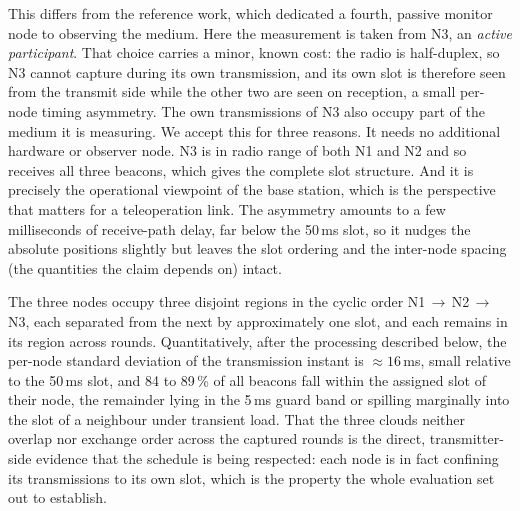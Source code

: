 This differs from the reference work, which dedicated a fourth, passive monitor
node to observing the medium. Here the measurement is taken from N3, an
\emph{active participant}. That choice carries a minor, known cost: the radio is
half-duplex, so N3 cannot capture during its own transmission, and its own slot
is therefore seen from the transmit side while the other two are seen on
reception, a small per-node timing asymmetry. The own transmissions of N3 also occupy
part of the medium it is measuring. We accept this for three reasons. It needs no
additional hardware or observer node. N3 is in radio range of both N1 and N2 and
so receives all three beacons, which gives the complete slot structure. And it is
precisely the operational viewpoint of the base station, which is the perspective that
matters for a teleoperation link. The asymmetry amounts to a few milliseconds of
receive-path delay, far below the 50\,ms slot, so it nudges the absolute positions
slightly but leaves the slot ordering and the inter-node spacing (the
quantities the claim depends on) intact.

The three nodes occupy three disjoint regions in the cyclic order
N1\,$\to$\,N2\,$\to$\,N3, each separated from the next by approximately one
slot, and each remains in its region across rounds. Quantitatively, after the
processing described below, the per-node standard deviation of the transmission
instant is $\approx 16$\,ms, small relative to the 50\,ms slot, and
84 to 89\,\% of all beacons fall within the assigned slot of their node, the remainder
lying in the 5\,ms guard band or spilling marginally into the slot of a neighbour
under transient load. That the three clouds neither overlap nor exchange order
across the captured rounds is the direct, transmitter-side evidence that the
schedule is being respected: each node is in fact confining its transmissions
to its own slot, which is the property the whole evaluation set out to
establish.


